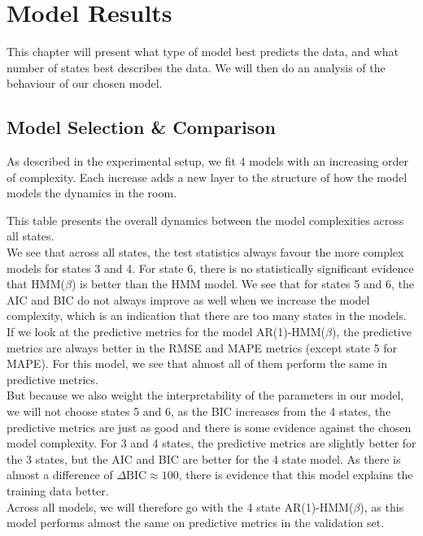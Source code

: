 \chapter{Model Results}
This chapter will present what type of model best predicts the data, and what number of states
best describes the data. We will then do an analysis of the behaviour of our chosen model.

\section{Model Selection \& Comparison}
As described in the experimental setup, we fit 4 models with an increasing order of complexity.
Each increase adds a new layer to the structure of how the model models the dynamics in the room.

This table presents the overall dynamics between the model complexities across all states. \\
We see that across all states, the test statistics always favour the more complex models for states 3 and 4.
For state 6, there is no statistically significant evidence that HMM($\beta$) is better than the HMM model. We see that for states 5 and 6,
the AIC and BIC do not always improve as well when we increase the model complexity, which is an indication that there are too many states
in the models. If we look at the predictive metrics for the model AR(1)-HMM($\beta$), the predictive metrics are always better in the RMSE
and MAPE metrics (except state 5 for MAPE). For this model, we see that almost all of them perform the same in predictive metrics. \\
But because we also weight the interpretability of the parameters in our model, we will not choose states 5 and 6, as the BIC increases from the 4 states,
the predictive metrics are just as good and there is some evidence against the chosen model complexity. For 3 and 4 states, the
predictive metrics are slightly better for the 3 states, but the AIC and BIC are better for the 4 state model. As there is almost a difference of
$\Delta \text{BIC} \approx 100$, there is evidence that this model explains the training data better. \\
\bigskip
Across all models, we will therefore go with the 4 state AR(1)-HMM($\beta$), as this model
performs almost the same on predictive metrics in the validation set.


